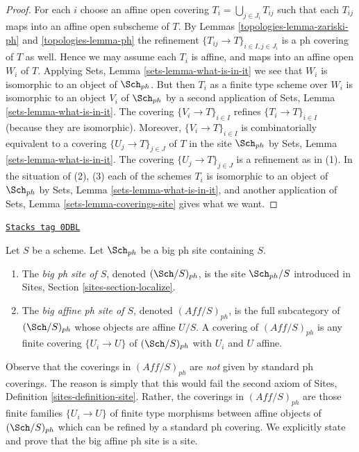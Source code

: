 \begin{proof}

For each $i$ choose an affine open covering $T_i = \bigcup_{j \in J_i} T_{ij}$
such that each $T_{ij}$ maps into an affine open subscheme of $T$. By
Lemmas \ref{topologies-lemma-zariski-ph} and \ref{topologies-lemma-ph}
the refinement $\{T_{ij} \to T\}_{i \in I, j \in J_i}$ is a ph covering
of $T$ as well. Hence we may assume each $T_i$ is affine, and maps into
an affine open $W_i$ of $T$. Applying
Sets, Lemma \ref{sets-lemma-what-is-in-it}
we see that $W_i$ is isomorphic to an object of $\Sch_{ph}$.
But then $T_i$ as a finite type scheme over $W_i$
is isomorphic to an object $V_i$ of $\Sch_{ph}$ by a second
application of
Sets, Lemma \ref{sets-lemma-what-is-in-it}.
The covering $\{V_i \to T\}_{i \in I}$ refines $\{T_i \to T\}_{i \in I}$
(because they are isomorphic).
Moreover, $\{V_i \to T\}_{i \in I}$ is combinatorially equivalent to a
covering $\{U_j \to T\}_{j \in J}$ of $T$ in the site
$\Sch_{ph}$ by
Sets, Lemma \ref{sets-lemma-what-is-in-it}.
The covering $\{U_j \to T\}_{j \in J}$ is a refinement as in (1).
In the situation of (2), (3) each of the
schemes $T_i$ is isomorphic to an object of $\Sch_{ph}$ by
Sets, Lemma \ref{sets-lemma-what-is-in-it},
and another application of
Sets, Lemma \ref{sets-lemma-coverings-site}
gives what we want.
\end{proof}

\begin{definition}
\label{topologies-definition-big-small-ph}
\href{https://stacks.math.columbia.edu/tag/0DBL}{\texttt{Stacks tag 0DBL}}

Let $S$ be a scheme. Let $\Sch_{ph}$ be a big ph site containing $S$.
\begin{enumerate}
\item The {\it big ph site of $S$}, denoted
$(\Sch/S)_{ph}$, is the site $\Sch_{ph}/S$
introduced in Sites, Section \ref{sites-section-localize}.
\item The {\it big affine ph site of $S$}, denoted
$(\textit{Aff}/S)_{ph}$, is the full subcategory of
$(\Sch/S)_{ph}$ whose objects are affine $U/S$.
A covering of $(\textit{Aff}/S)_{ph}$ is any finite covering
$\{U_i \to U\}$ of $(\Sch/S)_{ph}$ with $U_i$ and $U$ affine.
\end{enumerate}
\end{definition}

Observe that the coverings in $(\textit{Aff}/S)_{ph}$ are {\it not}
given by standard ph coverings. The reason is simply that this would
fail the second axiom of Sites, Definition \ref{sites-definition-site}.
Rather, the coverings in $(\textit{Aff}/S)_{ph}$ are those finite families
$\{U_i \to U\}$ of finite type morphisms between affine objects
of $(\Sch/S)_{ph}$ which can be refined by a standard ph covering.
We explicitly state and prove that the big affine ph site is a site.

